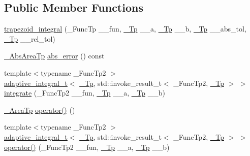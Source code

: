 \subsection*{Public Member Functions}
\begin{DoxyCompactItemize}
\item 
\hyperlink{class____gnu__cxx_1_1trapezoid__integral_a90fde7766cc7a14221a8b98480d5ae7c}{trapezoid\+\_\+integral} (\+\_\+\+Func\+Tp \+\_\+\+\_\+fun, \hyperlink{namespace____gnu__cxx_a3b19a9c800ca194374ef9172290f7d79}{\+\_\+\+Tp} \+\_\+\+\_\+a, \hyperlink{namespace____gnu__cxx_a3b19a9c800ca194374ef9172290f7d79}{\+\_\+\+Tp} \+\_\+\+\_\+b, \hyperlink{namespace____gnu__cxx_a3b19a9c800ca194374ef9172290f7d79}{\+\_\+\+Tp} \+\_\+\+\_\+abs\+\_\+tol, \hyperlink{namespace____gnu__cxx_a3b19a9c800ca194374ef9172290f7d79}{\+\_\+\+Tp} \+\_\+\+\_\+rel\+\_\+tol)
\item 
\hyperlink{class____gnu__cxx_1_1trapezoid__integral_a14ad7fdce0a3abc725d8d07adb5d340e}{\+\_\+\+Abs\+Area\+Tp} \hyperlink{class____gnu__cxx_1_1trapezoid__integral_ae5598587469757611020ea346ae8bf4f}{abs\+\_\+error} () const
\item 
{\footnotesize template$<$typename \+\_\+\+Func\+Tp2 $>$ }\\\hyperlink{struct____gnu__cxx_1_1adaptive__integral__t}{adaptive\+\_\+integral\+\_\+t}$<$ \hyperlink{namespace____gnu__cxx_a3b19a9c800ca194374ef9172290f7d79}{\+\_\+\+Tp}, std\+::invoke\+\_\+result\+\_\+t$<$ \+\_\+\+Func\+Tp2, \hyperlink{namespace____gnu__cxx_a3b19a9c800ca194374ef9172290f7d79}{\+\_\+\+Tp} $>$ $>$ \hyperlink{class____gnu__cxx_1_1trapezoid__integral_a11b2aa6156935929b6221be677c6f10f}{integrate} (\+\_\+\+Func\+Tp2 \+\_\+\+\_\+fun, \hyperlink{namespace____gnu__cxx_a3b19a9c800ca194374ef9172290f7d79}{\+\_\+\+Tp} \+\_\+\+\_\+a, \hyperlink{namespace____gnu__cxx_a3b19a9c800ca194374ef9172290f7d79}{\+\_\+\+Tp} \+\_\+\+\_\+b)
\item 
\hyperlink{class____gnu__cxx_1_1trapezoid__integral_a41c7c672204caf0e1b842c3664aca85f}{\+\_\+\+Area\+Tp} \hyperlink{class____gnu__cxx_1_1trapezoid__integral_a2a2ee81890e75ec627573eb1234079c8}{operator()} ()
\item 
{\footnotesize template$<$typename \+\_\+\+Func\+Tp2 $>$ }\\\hyperlink{struct____gnu__cxx_1_1adaptive__integral__t}{adaptive\+\_\+integral\+\_\+t}$<$ \hyperlink{namespace____gnu__cxx_a3b19a9c800ca194374ef9172290f7d79}{\+\_\+\+Tp}, std\+::invoke\+\_\+result\+\_\+t$<$ \+\_\+\+Func\+Tp2, \hyperlink{namespace____gnu__cxx_a3b19a9c800ca194374ef9172290f7d79}{\+\_\+\+Tp} $>$ $>$ \hyperlink{class____gnu__cxx_1_1trapezoid__integral_aa6bf7aa6b4dfae14bd9c26a267cd6d9f}{operator()} (\+\_\+\+Func\+Tp2 \+\_\+\+\_\+fun, \hyperlink{namespace____gnu__cxx_a3b19a9c800ca194374ef9172290f7d79}{\+\_\+\+Tp} \+\_\+\+\_\+a, \hyperlink{namespace____gnu__cxx_a3b19a9c800ca194374ef9172290f7d79}{\+\_\+\+Tp} \+\_\+\+\_\+b)
\end{DoxyCompactItemize}


